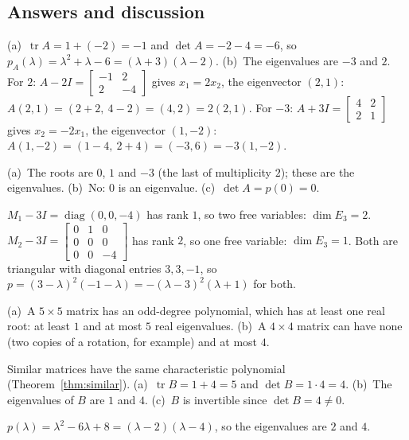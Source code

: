 \documentclass[11pt]{article}
\begin{document}
\subsection*{Answers and discussion}
\begin{description}[leftmargin=0pt,itemsep=5pt]
  \item[Knowledge Check \ref{kc:cpoly}.] (a)~$\operatorname{tr}A=1+(-2)=-1$ and $\det A=-2-4=-6$, so $p_A(\lambda)=\lambda^2+\lambda-6=(\lambda+3)(\lambda-2)$. (b)~The eigenvalues are $-3$ and $2$. For $2$: $A-2I=\begin{bmatrix}-1&2\\2&-4\end{bmatrix}$ gives $x_1=2x_2$, the eigenvector $(2,1)$: $A(2,1)=(2+2,\ 4-2)=(4,2)=2(2,1)$. For $-3$: $A+3I=\begin{bmatrix}4&2\\2&1\end{bmatrix}$ gives $x_2=-2x_1$, the eigenvector $(1,-2)$: $A(1,-2)=(1-4,\ 2+4)=(-3,6)=-3(1,-2)$.
  \item[Knowledge Check \ref{kc:readpoly}.] (a)~The roots are $0$, $1$ and $-3$ (the last of multiplicity $2$); these are the eigenvalues. (b)~No: $0$ is an eigenvalue. (c)~$\det A=p(0)=0$.
  \item[Knowledge Check \ref{kc:samepoly}.] $M_1-3I=\operatorname{diag}(0,0,-4)$ has rank $1$, so two free variables: $\dim E_3=2$. $M_2-3I=\begin{bmatrix}0&1&0\\0&0&0\\0&0&-4\end{bmatrix}$ has rank $2$, so one free variable: $\dim E_3=1$. Both are triangular with diagonal entries $3,3,-1$, so $p=(3-\lambda)^2(-1-\lambda)=-(\lambda-3)^2(\lambda+1)$ for both.
  \item[Knowledge Check \ref{kc:count}.] (a)~A $5\times5$ matrix has an odd-degree polynomial, which has at least one real root: at least $1$ and at most $5$ real eigenvalues. (b)~A $4\times4$ matrix can have none (two copies of a rotation, for example) and at most $4$.
  \item[Knowledge Check \ref{kc:sim}.] Similar matrices have the same characteristic polynomial (Theorem~\ref{thm:similar}). (a)~$\operatorname{tr}B=1+4=5$ and $\det B=1\cdot4=4$. (b)~The eigenvalues of $B$ are $1$ and $4$. (c)~$B$ is invertible since $\det B=4\neq0$.
  \item[Knowledge Check \ref{kc:td}.] $p(\lambda)=\lambda^2-6\lambda+8=(\lambda-2)(\lambda-4)$, so the eigenvalues are $2$ and $4$.

\end{description}
\end{document}
